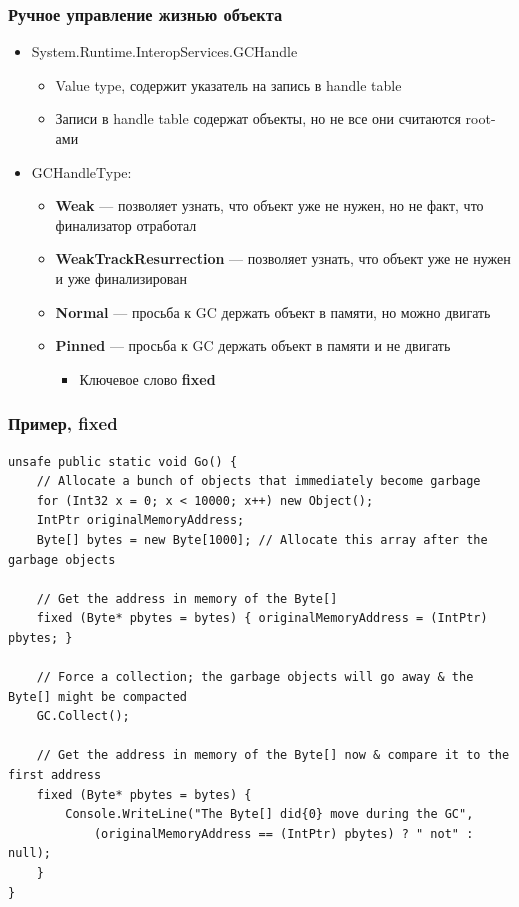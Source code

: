 \documentclass[xetex,mathserif,serif]{beamer}
\begin{document}
    \begin{frame}
        \frametitle{Ручное управление жизнью объекта}
        \begin{itemize}
            \item System.Runtime.InteropServices.GCHandle
            \begin{itemize}
                \item Value type, содержит указатель на запись в handle table
                \item Записи в handle table содержат объекты, но не все они считаются root-ами
            \end{itemize}
            \item GCHandleType:
            \begin{itemize}
                \item \textbf{Weak} --- позволяет узнать, что объект уже не нужен, но не факт, что финализатор отработал
                \item \textbf{WeakTrackResurrection} --- позволяет узнать, что объект уже не нужен и уже финализирован
                \item \textbf{Normal} --- просьба к GC держать объект в памяти, но можно двигать
                \item \textbf{Pinned} --- просьба к GC держать объект в памяти и не двигать
                \begin{itemize}
                    \item Ключевое слово \textbf{fixed}
                \end{itemize}
            \end{itemize}
        \end{itemize}
    \end{frame}

    \begin{frame}[fragile]
        \frametitle{Пример, fixed}
        \begin{scriptsize}
            \begin{verbatim}
unsafe public static void Go() {
    // Allocate a bunch of objects that immediately become garbage
    for (Int32 x = 0; x < 10000; x++) new Object();
    IntPtr originalMemoryAddress;
    Byte[] bytes = new Byte[1000]; // Allocate this array after the garbage objects

    // Get the address in memory of the Byte[]
    fixed (Byte* pbytes = bytes) { originalMemoryAddress = (IntPtr) pbytes; }

    // Force a collection; the garbage objects will go away & the Byte[] might be compacted
    GC.Collect();

    // Get the address in memory of the Byte[] now & compare it to the first address
    fixed (Byte* pbytes = bytes) {
        Console.WriteLine("The Byte[] did{0} move during the GC",
            (originalMemoryAddress == (IntPtr) pbytes) ? " not" : null);
    }
}
            \end{verbatim}
        \end{scriptsize}
    \end{frame}
\end{document}
